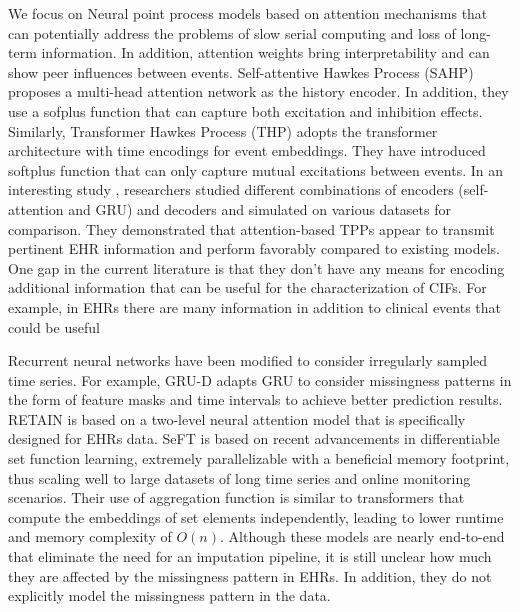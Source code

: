 \documentclass[journal,twoside,web]{ieeecolor}
\begin{document}
We focus on Neural point process models based on attention mechanisms that can potentially address the problems of slow serial computing and loss of long-term information. In addition, attention weights bring interpretability and can show peer influences between events. Self-attentive Hawkes Process (SAHP) \cite*{zhangSelfAttentiveHawkesProcess2020} proposes a multi-head attention network as the history encoder. In addition, they use a sofplus function that can capture both excitation and inhibition effects. Similarly, Transformer Hawkes Process (THP) \cite*{zuoTransformerHawkesProcess2020a} adopts the transformer architecture \cite*{vaswaniAttentionAllYou2017} with time encodings for event embeddings. They have introduced softplus function that can only capture mutual excitations between events. In an interesting study \cite*{enguehardNeuralTemporalPoint2020}, researchers studied different combinations of encoders (self-attention and GRU) and decoders and simulated on various datasets for comparison. They demonstrated that attention-based TPPs appear to transmit pertinent EHR information and perform favorably compared to existing models. One gap in the current literature is that they don't have any means for encoding additional information that can be useful for the characterization of CIFs. For example, in EHRs there are many information in addition to clinical events that could be useful

Recurrent neural networks have been modified to consider irregularly sampled time series. For example, GRU-D \cite*{cheRecurrentNeuralNetworks2018} adapts GRU to consider missingness patterns in the form of feature masks and time intervals to achieve better prediction results. RETAIN \cite*{choiRETAINInterpretablePredictive2017} is based on a two-level neural attention model that is specifically designed for EHRs data. SeFT \cite*{hornSetFunctionsTime2020} is based on recent advancements in differentiable set function learning, extremely parallelizable with a beneficial memory footprint, thus scaling well to large datasets of long time series and online monitoring scenarios. Their use of aggregation function is similar to transformers that compute the embeddings of set elements independently, leading to lower runtime and memory complexity of $O(n)$. Although these models are nearly end-to-end that eliminate the need for an imputation pipeline, it is still unclear how much they are affected by the missingness pattern in EHRs. In addition, they do not explicitly model the missingness pattern in the data.
\end{document}
